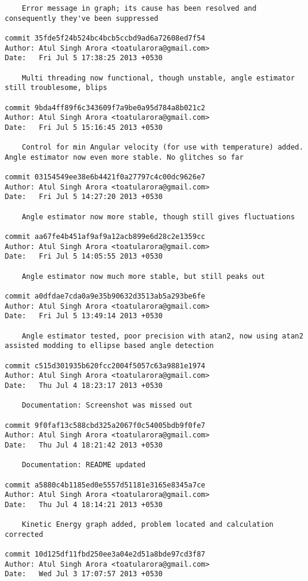 \begin{lstlisting}
    Error message in graph; its cause has been resolved and consequently they've been suppressed

commit 35fde5f24b524bc4bcb5ccbd9ad6a72608ed7f54
Author: Atul Singh Arora <toatularora@gmail.com>
Date:   Fri Jul 5 17:38:25 2013 +0530

    Multi threading now functional, though unstable, angle estimator still troublesome, blips

commit 9bda4ff89f6c343609f7a9be0a95d784a8b021c2
Author: Atul Singh Arora <toatularora@gmail.com>
Date:   Fri Jul 5 15:16:45 2013 +0530

    Control for min Angular velocity (for use with temperature) added. Angle estimator now even more stable. No glitches so far

commit 03154549ee38e6b4421f0a27797c4c00dc9626e7
Author: Atul Singh Arora <toatularora@gmail.com>
Date:   Fri Jul 5 14:27:20 2013 +0530

    Angle estimator now more stable, though still gives fluctuations

commit aa67fe4b451af9af9a12acb899e6d28c2e1359cc
Author: Atul Singh Arora <toatularora@gmail.com>
Date:   Fri Jul 5 14:05:55 2013 +0530

    Angle estimator now much more stable, but still peaks out

commit a0dfdae7cda0a9e35b90632d3513ab5a293be6fe
Author: Atul Singh Arora <toatularora@gmail.com>
Date:   Fri Jul 5 13:49:14 2013 +0530

    Angle estimator tested, poor precision with atan2, now using atan2 assisted modding to ellipse based angle detection

commit c515d301935b620fcc2004f5057c63a9881e1974
Author: Atul Singh Arora <toatularora@gmail.com>
Date:   Thu Jul 4 18:23:17 2013 +0530

    Documentation: Screenshot was missed out

commit 9f0faf13c588cbd325a2067f0c54005bdb9f0fe7
Author: Atul Singh Arora <toatularora@gmail.com>
Date:   Thu Jul 4 18:21:42 2013 +0530

    Documentation: README updated

commit a5880c4b1185ed0e5557d51181e3165e8345a7ce
Author: Atul Singh Arora <toatularora@gmail.com>
Date:   Thu Jul 4 18:14:21 2013 +0530

    Kinetic Energy graph added, problem located and calculation corrected

commit 10d125df11fbd250ee3a04e2d51a8bde97cd3f87
Author: Atul Singh Arora <toatularora@gmail.com>
Date:   Wed Jul 3 17:07:57 2013 +0530


\end{lstlisting}
